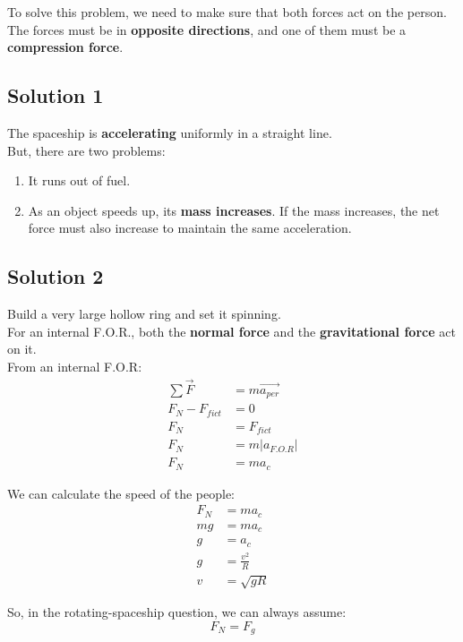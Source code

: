 To solve this problem, we need to make sure that both forces act on the person. The forces must 
be in \textbf{opposite directions}, and one of them must be a \textbf{compression force}.\\

\subsection*{Solution 1}
The spaceship is \textbf{accelerating} uniformly in a straight line.\\

But, there are two problems:
\begin{enumerate}
    \item It runs out of fuel.
    \item As an object speeds up, its \textbf{mass increases}. If the mass increases, the net force must also increase to maintain the same acceleration.
\end{enumerate}

\subsection*{Solution 2}
Build a very large hollow ring and set it spinning.\\

For an internal F.O.R., both the \textbf{normal force} and the \textbf{gravitational force} act on it.\\

From an internal F.O.R:
\begin{align*}
    \sum \vec{F} &= m \vec{a_{per}}\\
    F_{N} - F_{fict} &= 0\\
    F_{N} &= F_{fict}\\
    F_{N} &= m\left| a_{F.O.R}\right| \\
    F_{N} &= ma_{c}
\end{align*}

We can calculate the speed of the people:
\begin{align*} 
    F_{N} &= ma_{c}\\
    mg &= ma_{c}\\
    g &= a_{c}\\
    g &= \frac{v^2}{R}\\
    v &= \sqrt{gR}
\end{align*}

So, in the rotating-spaceship question, we can always assume:
\begin{equation*}
    F_{N} = F_{g}
\end{equation*}

